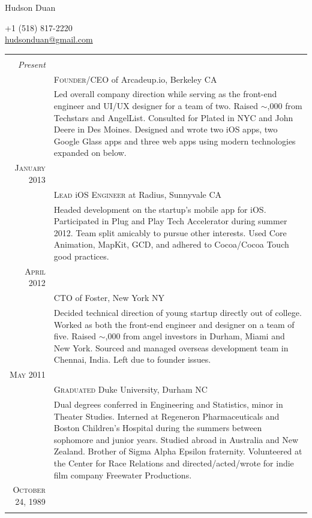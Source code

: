 \documentclass[11pt, letterpaper, UTF-8]{article}
\begin{document}
\begin{center}
\par{\Huge{{\selectfont Hudson Duan}}\bigskip\par}
+1 (518) 817-2220\\
\href{mailto:hudsonduan@gmail.com}{hudsonduan@gmail.com}
\\
\end{center}

\begin{tabular}{r|p{11cm}}
\hline \\
\emph{Present} & \\
& \textsc{Founder/CEO} of Arcadeup.io, Berkeley CA \\
& \footnotesize{Led overall company direction while serving as the front-end engineer and UI/UX designer for a team of two. Raised $\sim$\textdollar125,000 from Techstars and AngelList. Consulted for Plated in NYC and John Deere in Des Moines. Designed and wrote two iOS apps, two Google Glass apps and three web apps using modern technologies expanded on below.}\\
\textsc{January 2013} & \\
& \textsc{Lead} iOS \textsc{Engineer} at Radius, Sunnyvale CA \emph{}\\
& \footnotesize{Headed development on the startup's mobile app for iOS. Participated in Plug and Play Tech Accelerator during summer 2012. Team split amicably to pursue other interests. Used Core Animation, MapKit, GCD, and adhered to Cocoa/Cocoa Touch good practices.}\\
\textsc{April 2012} & \\
& \textsc{CTO} of Foster, New York NY \\
& \footnotesize{Decided technical direction of young startup directly out of college. Worked as both the front-end engineer and designer on a team of five. Raised $\sim$\textdollar250,000 from angel investors in Durham, Miami and New York. Sourced and managed overseas development team in Chennai, India. Left due to founder issues.}\\
\textsc{May 2011} & \\
& \textsc{Graduated} Duke University, Durham NC \\
& \footnotesize{Dual degrees conferred in Engineering and Statistics, minor in Theater Studies. Interned at Regeneron Pharmaceuticals and Boston Children's Hospital during the summers between sophomore and junior years. Studied abroad in Australia and New Zealand. Brother of Sigma Alpha Epsilon fraternity. Volunteered at the Center for Race Relations and directed/acted/wrote for indie film company Freewater Productions.}\\
\textsc{October 24, 1989} & \\\\
\hline
\end{tabular}
\end{document}
